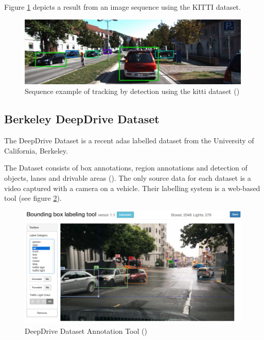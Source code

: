 Figure \ref{fig:kittiresult} depicts a result from an image sequence using the KITTI dataset. 

\begin{figure}[h]
	
	\centering
	\includegraphics[width=0.99\textwidth]{capstate/imgs/kittiresult}
	
	\caption{Sequence example of tracking by detection using the \gls{kitti} dataset (\cite{KarlsruheInstituteofTechnology})}
	\label{fig:kittiresult}
	
\end{figure}

\subsection{Berkeley DeepDrive Dataset}

The DeepDrive Dataset is a recent \gls{adas} labelled dataset from the University of California, Berkeley.

The Dataset consists of box annotations, region annotations and detection of objects, lanes and drivable areas (\cite{Yu2018}). The only source data for each dataset is a video captured with a camera on a vehicle. Their labelling system is a web-based tool (see figure \ref{fig:berkeletool}). 

\begin{figure}[htp]
	
	\centering
	\includegraphics[width=0.99\textwidth]{capstate/imgs/berveleytool.png}
	
	\caption{DeepDrive Dataset Annotation Tool (\cite{Yu2018})}
	\label{fig:berkeletool}
	
\end{figure}


